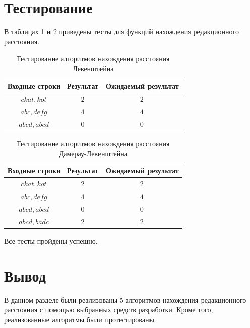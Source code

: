\documentclass{report}
\begin{document}
\section{Тестирование}

В таблицах \ref{tbl:test1} и \ref{tbl:test2} приведены тесты для функций нахождения редакционного расстояния.

\begin{table}[h!p]
	\begin{center}
		\caption{\label{tbl:test1}Тестирование алгоритмов нахождения расстояния Левенштейна}
		\begin{tabular}{|c|c|c|}
			\hline
			Входные строки & Результат & Ожидаемый результат \\ 
			\hline
			$ckat, kot$ & $2$  & $2$\\\hline
			$abc, defg$  & $4$  & $4$\\\hline
			$abcd, abcd$  & $0$  & $0$\\\hline
		\end{tabular}
	\end{center}
\end{table}

\begin{table}[h!p]
	\begin{center}
		\caption{\label{tbl:test2}Тестирование алгоритмов нахождения расстояния Дамерау-Левенштейна}
		\begin{tabular}{|c|c|c|}
			\hline
			Входные строки & Результат & Ожидаемый результат \\ 
			\hline
			$ckat, kot$ & $2$  & $2$\\\hline
			$abc, defg$  & $4$  & $4$\\\hline
			$abcd, abcd$  & $0$  & $0$\\\hline
			$abcd, badc$  & $2$  & $2$\\\hline
		\end{tabular}
	\end{center}
\end{table}

Все тесты пройдены успешно.

\section{Вывод}

В данном разделе были реализованы 5 алгоритмов нахождения редакционного расстояния с помощью выбранных средств разработки. Кроме того, реализованные алгоритмы были протестированы.
\end{document}
